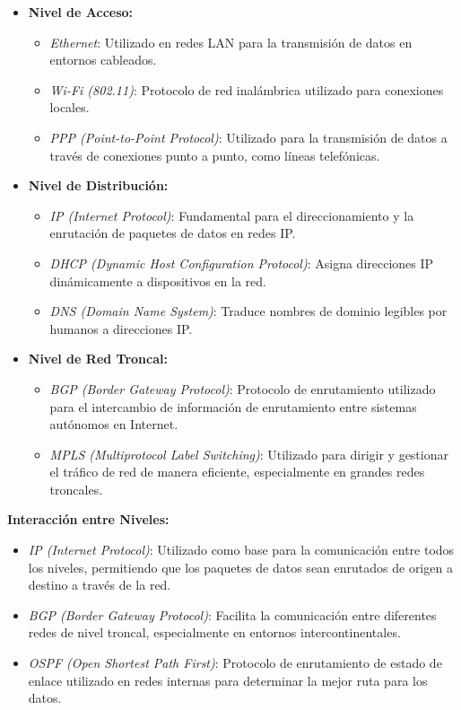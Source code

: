 \documentclass[12pt]{report}
\begin{document}
\begin{itemize}
	\item \textbf{Nivel de Acceso:}
	\begin{itemize}
		\item \textit{Ethernet}: Utilizado en redes LAN para la transmisión de datos en entornos cableados.
		\item \textit{Wi-Fi (802.11)}: Protocolo de red inalámbrica utilizado para conexiones locales.
		\item \textit{PPP (Point-to-Point Protocol)}: Utilizado para la transmisión de datos a través de conexiones punto a punto, como líneas telefónicas.
	\end{itemize}
	
	\item \textbf{Nivel de Distribución:}
	\begin{itemize}
		\item \textit{IP (Internet Protocol)}: Fundamental para el direccionamiento y la enrutación de paquetes de datos en redes IP.
		\item \textit{DHCP (Dynamic Host Configuration Protocol)}: Asigna direcciones IP dinámicamente a dispositivos en la red.
		\item \textit{DNS (Domain Name System)}: Traduce nombres de dominio legibles por humanos a direcciones IP.
	\end{itemize}
	
	\item \textbf{Nivel de Red Troncal:}
	\begin{itemize}
		\item \textit{BGP (Border Gateway Protocol)}: Protocolo de enrutamiento utilizado para el intercambio de información de enrutamiento entre sistemas autónomos en Internet.
		\item \textit{MPLS (Multiprotocol Label Switching)}: Utilizado para dirigir y gestionar el tráfico de red de manera eficiente, especialmente en grandes redes troncales.
	\end{itemize}
\end{itemize}

\noindent \textbf{Interacción entre Niveles:}
\begin{itemize}
	\item \textit{IP (Internet Protocol)}: Utilizado como base para la comunicación entre todos los niveles, permitiendo que los paquetes de datos sean enrutados de origen a destino a través de la red.
	\item \textit{BGP (Border Gateway Protocol)}: Facilita la comunicación entre diferentes redes de nivel troncal, especialmente en entornos intercontinentales.
	\item \textit{OSPF (Open Shortest Path First)}: Protocolo de enrutamiento de estado de enlace utilizado en redes internas para determinar la mejor ruta para los datos.
\end{itemize}
\end{document}
